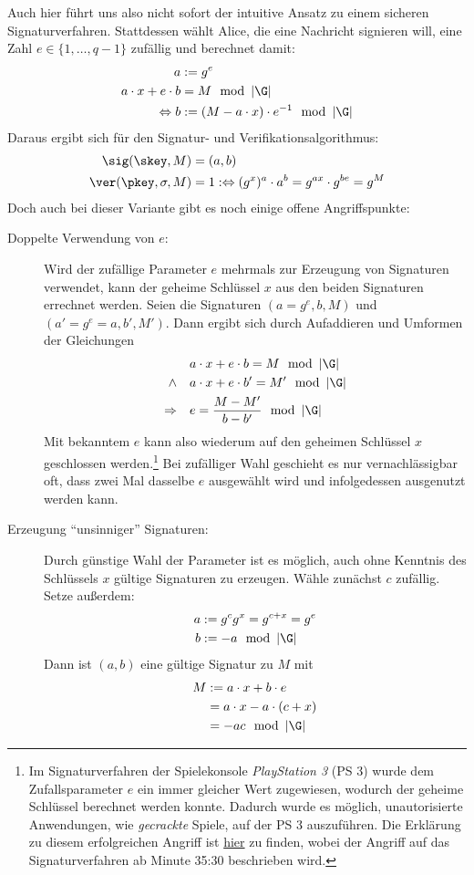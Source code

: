 Auch hier führt uns also nicht sofort der intuitive Ansatz zu einem sicheren Signaturverfahren. Stattdessen wählt Alice, die eine Nachricht signieren will, eine Zahl $e \in \{1, \dots, q - 1\}$ zufällig und berechnet damit:
\begin{align*}
a &:= g^e\\
a \cdot x + e \cdot b &= M \mod \left|\G\right|\\
\Leftrightarrow b &:= (M - a \cdot x) \cdot e^{-1} \mod \left|\G\right|
\end{align*}
Daraus ergibt sich für den Signatur- und Verifikationsalgorithmus:
\begin{align*}
\sig(\skey,M) &= (a, b)\\
\ver(\pkey,\sigma,M) &= 1 :\Leftrightarrow (g^x)^a \cdot a^b = g^{ax} \cdot g^{be} = g^M
\end{align*}
Doch auch bei dieser Variante gibt es noch einige offene Angriffspunkte:
\begin{description}
	\item[Doppelte Verwendung von $e$:]
	Wird der zufällige Parameter $e$ mehrmals zur Erzeugung von Signaturen verwendet, kann der geheime Schlüssel $x$ aus den beiden Signaturen errechnet werden. Seien die Signaturen $(a = g^e, b, M)$ und $(a' = g^{e} = a, b', M')$. Dann ergibt sich durch Aufaddieren und Umformen
	der Gleichungen
	\begin{align*}
	&a \cdot x + e \cdot b = M \mod \left|\G\right|\\
	\land \quad &a \cdot x + e \cdot b' = M' \mod \left|\G\right|\\
	\Rightarrow \quad &e = \frac{M - M'}{b - b'} \mod \left|\G\right|
	\end{align*}
	Mit bekanntem $e$ kann also wiederum auf den geheimen Schlüssel $x$ geschlossen werden.\footnote{Im Signaturverfahren der Spielekonsole \textit{PlayStation 3} (PS 3) wurde dem Zufallsparameter $e$ ein immer gleicher Wert zugewiesen, wodurch der geheime Schlüssel berechnet werden konnte. Dadurch wurde es möglich, unautorisierte Anwendungen, wie \textit{gecrackte} Spiele, auf der PS 3 auszuführen. Die Erklärung zu diesem erfolgreichen Angriff ist \href{https://www.youtube.com/watch?v=4loZGYqaZ7I}{hier} zu finden, wobei der Angriff auf das Signaturverfahren ab Minute 35:30 beschrieben wird.} Bei zufälliger Wahl geschieht es nur vernachlässigbar oft, dass zwei Mal dasselbe $e$ ausgewählt wird und infolgedessen ausgenutzt werden kann.
	\item[Erzeugung "`unsinniger"' Signaturen:]
	Durch günstige Wahl der Parameter ist es möglich, auch ohne Kenntnis des Schlüssels $x$ gültige Signaturen zu erzeugen. Wähle zunächst $c$
	zufällig. Setze außerdem:
	\begin{align*}
	a &:= g^cg^x = g^{c+x} = g^e\\
	b &:= -a \mod \left|\G\right|
	\end{align*}
	Dann ist $(a, b)$ eine gültige Signatur zu $M$ mit
	\begin{align*}
	M &:= a \cdot x + b \cdot e\\
	&= a \cdot x - a \cdot (c + x)\\
	&= -ac \mod \left|\G\right|
	\end{align*}
\end{description}

